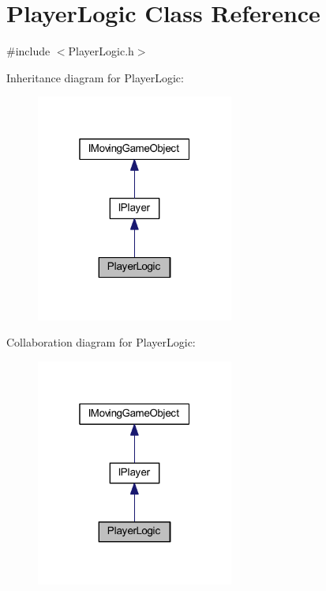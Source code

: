 \hypertarget{class_player_logic}{}\section{Player\+Logic Class Reference}
\label{class_player_logic}


{\ttfamily \#include $<$Player\+Logic.\+h$>$}



Inheritance diagram for Player\+Logic\+:\nopagebreak
\begin{figure}[H]
\begin{center}
\leavevmode
\includegraphics[width=184pt]{class_player_logic__inherit__graph}
\end{center}
\end{figure}


Collaboration diagram for Player\+Logic\+:\nopagebreak
\begin{figure}[H]
\begin{center}
\leavevmode
\includegraphics[width=184pt]{class_player_logic__coll__graph}
\end{center}
\end{figure}
